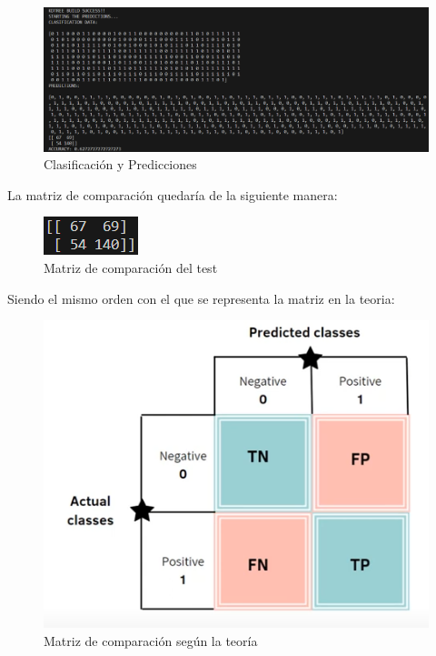 \documentclass[12pt]{article} %
\begin{document}
\begin{figure}[H]
\centering
\includegraphics[width=\textwidth]{data2}
\caption{Clasificación y Predicciones}
\end{figure}

La matriz de comparación quedaría de la siguiente manera:

\begin{figure}[H]
\centering
\includegraphics[width=\textwidth]{data3}
\caption{Matriz de comparación del test}
\end{figure}

Siendo el mismo orden con el que se representa la matriz en la teoria:

\begin{figure}[H]
\centering
\includegraphics[width=\textwidth]{MatrizComparacion}
\caption{Matriz de comparación según la teoría}
\end{figure}
\end{document}
